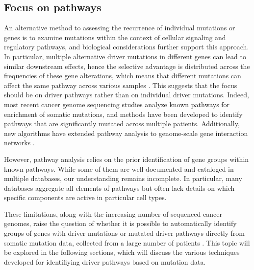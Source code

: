 \subsection{Focus on pathways}

An alternative method to assessing the recurrence of individual mutations or genes is to examine mutations within the context of cellular signaling and regulatory pathways, and biological considerations further support this approach. In particular, multiple alternative driver mutations in different genes can lead to similar downstream effects, hence the selective advantage is distributed across the frequencies of these gene alterations, which means that different mutations can affect the same pathway across various samples \cite{mutex, multi-dendrix}. This suggests that the focus should be on driver pathways rather than on individual driver mutations. Indeed, most recent cancer genome sequencing studies analyze known pathways for enrichment of somatic mutations, and methods have been developed to identify pathways that are significantly mutated across multiple patients. Additionally, new algorithms have extended pathway analysis to genome-scale gene interaction networks \cite{dendrix}.

However, pathway analysis relies on the prior identification of gene groups within known pathways. While some of them are well-documented and cataloged in multiple databases, our understanding remains incomplete. In particular, many databases aggregate all elements of pathways but often lack details on which specific components are active in particular cell types.

These limitations, along with the increasing number of sequenced cancer genomes, raise the question of whether it is possible to automatically identify groups of genes with driver mutations or mutated driver pathways directly from somatic mutation data, collected from a large number of patients \cite{dendrix}. This topic will be explored in the following sections, which will discuss the various techniques developed for identifiying driver pathways based on mutation data.

%
%

